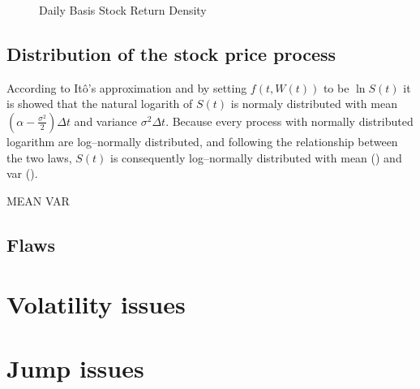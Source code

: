 \documentclass[12pt]{report}
\newcommand{\Bm}{W\left(t\right)}
\newcommand{\Dt}{\Delta t}
\newcommand{\ft}{f\left(t, \Bm \right)}
\newcommand{\St}{S\left(t\right)}
\begin{document}
 
\begin{figure}[!h]
\centering

\caption{Daily Basis Stock Return Density}
\label{plot:returnDensity}
\end{figure}

\subsection{Distribution of the stock price process}
\label{sub:Distribution of the stock price process}

According to Itô's approximation and by setting $\ft$ to be $\ln{\St}$ it is showed that the natural logarith of $\St$ is normaly distributed with mean
$\left(\alpha - \frac{\sigma^2}{2}\right) \Dt$ and variance $\sigma^2 \Dt$.
Because every process with normally distributed logarithm are log--normally distributed, and following the relationship between the two laws, $\St$ is consequently log--normally distributed with mean () and var ().

MEAN
VAR

\subsection{Flaws}
\label{sub:Flaws}



\section{Volatility issues}
\label{sec:Volatility issues}



\section{Jump issues}
\label{sec:Jump issues}
%
%
\end{document}
